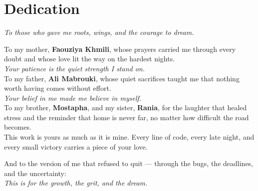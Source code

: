 \chapter*{Dedication}

\vspace*{0.8cm}

\begin{center}
{\Large\itshape To those who gave me roots, wings, and the courage to dream.}
\end{center}

\vspace{0.6cm}

\begin{center}
\begin{minipage}{0.9\textwidth}
\centering
{}

To my mother, \textbf{Faouziya Khmili}, whose prayers carried me through every doubt and whose love lit the way on the hardest nights.\\
\textit{Your patience is the quiet strength I stand on.}\\[0.4cm]

To my father, \textbf{Ali Mabrouki}, whose quiet sacrifices taught me that nothing worth having comes without effort.\\
\textit{Your belief in me made me believe in myself.}\\[0.4cm]

To my brother, \textbf{Mostapha}, and my sister, \textbf{Rania}, for the laughter that healed stress and the reminder that home is never far, no matter how difficult the road becomes.\\[0.4cm]

This work is yours as much as it is mine. Every line of code, every late night, and every small victory carries a piece of your love.

\vspace{0.6cm}

And to the version of me that refused to quit --- through the bugs, the deadlines, and the uncertainty:\\
\textit{This is for the growth, the grit, and the dream.}

\end{minipage}
\end{center}

\vfill

